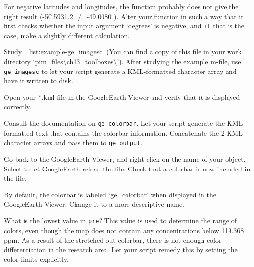\begin{action}
For negative latitudes and longitudes, the function probably does not give the right result (-50$^{\circ}$59\textquotesingle{}31.2\textquotesingle{}\textquotesingle{} $\neq$ -49.0080$^{\circ}$). Alter your function in such a way that it first checks whether the input argument `degrees' is negative, and {\tt if} that is the case, make a slightly different calculation.
\end{action}

\begin{action}
Study \lstlistingname~\ref{list:example-ge_imagesc} (You can find a copy of this file in your work directory `pim\_files\textbackslash{}ch13\_toolboxes\textbackslash{}'). After studying the example m-file, use {\tt ge\_imagesc} to let your script generate a KML-formatted character array and have it written to disk.
\end{action}

\begin{action}
Open your *.kml file in the GoogleEarth Viewer and verify that it is displayed correctly. 
\end{action}
\begin{action}
Consult the documentation on {\tt ge\_colorbar}. Let your script generate the KML-formatted text that contains the colorbar information. Concatenate the 2 KML character arrays and pass them to {\tt ge\_output}.
\end{action}
\begin{action}
Go back to the GoogleEarth Viewer, and right-click on the name of your object. Select  to let GoogleEarth reload the file. Check that a colorbar is now included in the file.
\end{action}
\begin{action}
By default, the colorbar is labeled `ge\_colorbar' when displayed in the GoogleEarth Viewer. Change it to a more descriptive name.
\end{action}

\begin{action}
What is the lowest value in {\tt pre}? This value is used to determine the range of colors, even though the map does not contain any concentrations below 119.368 ppm. As a result of the stretched-out colorbar, there is not enough color differentiation in the research area. Let your script remedy this by setting the color limits explicitly.
\end{action}


